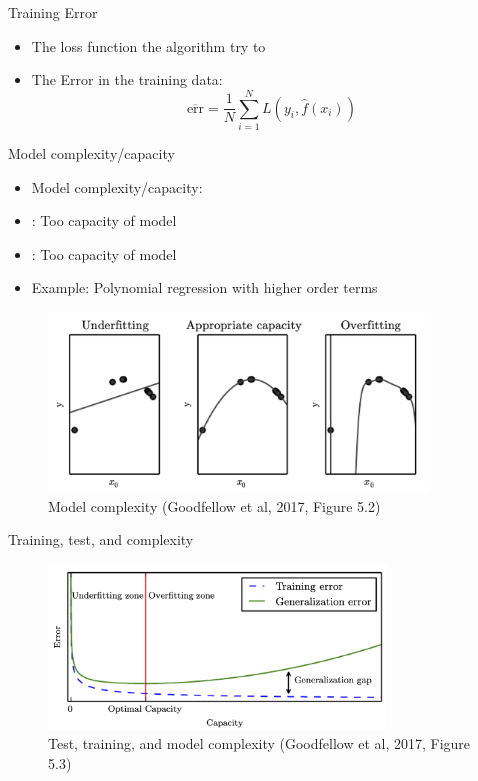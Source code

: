\documentclass[10pt,handout]{beamer}
\begin{document}
\begin{frame}{Training Error}

\begin{itemize}
\item The loss function the algorithm try to 
\item The Error in the training data:
\[
\overline{\text{err}} = \frac{1}{N} \sum_{i=1}^N L(y_i,\hat{f}(x_i))
\]

\end{itemize}

\end{frame}


\begin{frame}{Model complexity/capacity}

\begin{itemize}
\item Model complexity/capacity: 
\item {}: Too  capacity of model
\item {}: Too  capacity of model
\item Example: Polynomial regression with higher order terms
\end{itemize}

\begin{figure}[h]
\caption{Model complexity (Goodfellow et al, 2017, Figure 5.2)}
\centering
\includegraphics[width=0.9\textwidth]{figs/Dl_5_2}
\end{figure}

\end{frame}


\begin{frame}{Training, test, and complexity}


\begin{figure}[h]
\caption{Test, training, and model complexity (Goodfellow et al, 2017, Figure 5.3)}
\centering
\includegraphics[width=0.8\textwidth]{figs/Dl_5_3.png}
\end{figure}

\end{frame}
\end{document}
